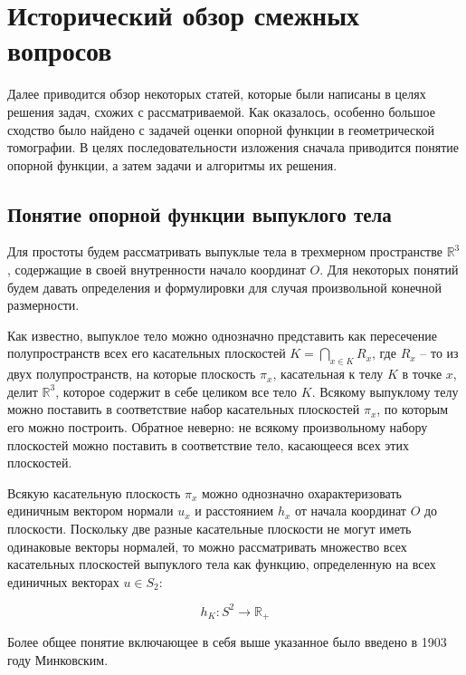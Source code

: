 \documentclass[a4paper, 12pt, titlepage]{article}
\theoremstyle{definition}
\theoremstyle{plain}
\theoremstyle{plain}
\begin{document}
\newpage
\section{Исторический обзор смежных вопросов}
\label{sec:history}

Далее приводится обзор некоторых статей, которые были написаны в целях решения
задач, схожих с рассматриваемой. Как оказалось, особенно большое сходство было
найдено с задачей оценки опорной функции в геометрической томографии. В целях
последовательности изложения сначала приводится понятие опорной функции, а
затем задачи и алгоритмы их решения.

\subsection{Понятие опорной функции выпуклого тела}
\label{sec:support-function}

Для простоты будем рассматривать выпуклые тела в трехмерном пространстве
$\mathbb{R}^{3}$, содержащие в своей внутренности начало координат $O$.
Для некоторых понятий будем давать определения и формулировки для случая
произвольной конечной размерности.

Как известно, выпуклое тело можно однозначно представить как пересечение 
полупространств всех его касательных плоскостей 
$K = \bigcap \limits_{x \in K} R_{x}$, где $R_{x}$ -- то из двух
полупространств, на которые плоскость $\pi_{x}$, касательная к телу $K$ в
точке $x$, делит $\mathbb{R}^{3}$, которое содержит в себе целиком все тело
$K$. Всякому выпуклому телу можно поставить в соответствие набор касательных 
плоскостей $\pi_{x}$, по которым его можно построить. Обратное неверно: не
всякому произвольному набору плоскостей можно поставить в соответствие тело,
касающееся всех этих плоскостей.

Всякую касательную плоскость $\pi_{x}$ можно однозначно охарактеризовать
единичным вектором нормали $u_{x}$ и расстоянием $h_{x}$ от начала координат 
$O$ до плоскости. Поскольку две разные касательные плоскости не могут иметь
одинаковые векторы нормалей, то можно рассматривать множество всех касательных
плоскостей выпуклого тела как функцию, определенную на всех единичных векторах
$u \in S_{2}$:

\begin{equation}h_{K}: S^{2} \to \mathbb{R}_{+}\end{equation}

Более общее понятие включающее в себя выше указанное было введено в 1903 году
Минковским.
\end{document}
